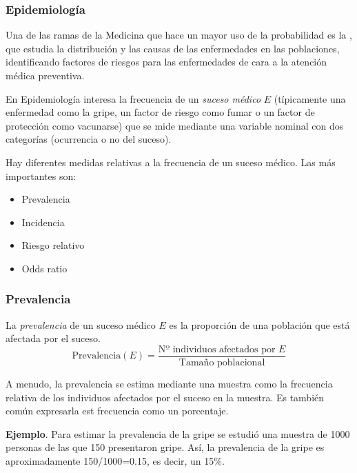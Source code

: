 \begin{frame}
\frametitle{Epidemiología}
Una de las ramas de la Medicina que hace un mayor uso de la probabilidad es la , que estudia la distribución y las causas de las enfermedades en las poblaciones, identificando factores de riesgos para las enfermedades de cara a la atención médica preventiva. 

En Epidemiología interesa la frecuencia de un \emph{suceso médico} $E$ (típicamente una enfermedad como la gripe, un factor de riesgo como fumar o un factor de protección como vacunarse) que se mide mediante una variable nominal con dos categorías (ocurrencia o no del suceso).

Hay diferentes medidas relativas a la frecuencia de un suceso médico.
Las más importantes son:

\begin{itemize}
  \item Prevalencia
  \item Incidencia
  \item Riesgo relativo
  \item Odds ratio
\end{itemize}
\end{frame}


\begin{frame}
\frametitle{Prevalencia}
\begin{definition}[Prevalencia]
La \emph{prevalencia} de un suceso médico $E$ es la proporción de una población que está afectada por el suceso. 
\[
  \mbox{Prevalencia}(E) = \frac{\mbox{Nº individuos afectados por $E$}}{\mbox{Tamaño poblacional}}
\]
\end{definition}

A menudo, la prevalencia se estima mediante una muestra como la frecuencia relativa de los individuos afectados por el suceso en la muestra.
Es también común expresarla est frecuencia como un porcentaje. 

\textbf{Ejemplo}. Para estimar la prevalencia de la gripe se estudió una muestra de 1000 personas de las que 150 presentaron gripe.
Así, la prevalencia de la gripe es aproximadamente 150/1000=0.15, es decir, un 15\%. 
\end{frame}
  

